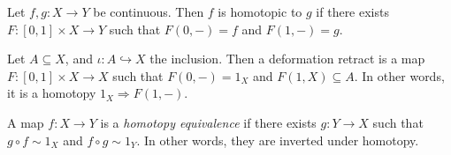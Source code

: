 \begin{definition}[Homotopy]\label{dfn:owo}
	Let $f,g : X \to Y$ be continuous. Then $f$ is homotopic to $g$ if there exists $F : [0,1] \times X\to Y$ such that $F(0,-)=f$ and $F(1,-)=g$.
\end{definition}
\begin{definition}\label{dfn:ouwu}
	Let $A\subseteq X$, and $\iota : A \hookrightarrow X$ the inclusion. Then a deformation retract is a map $F : [0,1]\times X \to X$ such that $F(0,-)=1_X$ and $F(1,X)\subseteq A$. In other words, it is a homotopy $1_X \Rightarrow F(1,-) $.
\end{definition}
\begin{definition}\label{dfn:kkk}
	A map $f : X \to Y$ is a \emph{homotopy equivalence} if there exists $g : Y \to X$ such that $g\circ f\sim 1_X$ and $f\circ g\sim 1_Y$. In other words, they are inverted under homotopy.
\end{definition}

